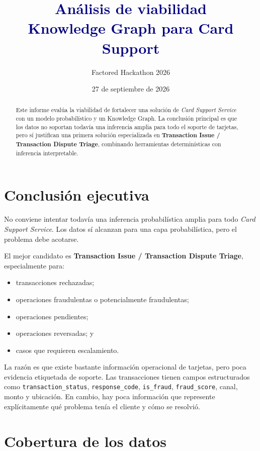 \documentclass[11pt,a4paper]{article}
\title{\textcolor{navy}{Análisis de viabilidad\\[2pt] Knowledge Graph para Card Support}}
\author{Factored Hackathon 2026}
\date{27 de septiembre de 2026}
\begin{document}
\maketitle

\begin{abstract}
Este informe evalúa la viabilidad de fortalecer una solución de \emph{Card Support Service} con un modelo probabilístico y un Knowledge Graph. La conclusión principal es que los datos no soportan todavía una inferencia amplia para todo el soporte de tarjetas, pero sí justifican una primera solución especializada en \textbf{Transaction Issue / Transaction Dispute Triage}, combinando herramientas determinísticas con inferencia interpretable.
\end{abstract}

\section{Conclusión ejecutiva}

No conviene intentar todavía una inferencia probabilística amplia para todo \emph{Card Support Service}. Los datos sí alcanzan para una capa probabilística, pero el problema debe acotarse.

El mejor candidato es \textbf{Transaction Issue / Transaction Dispute Triage}, especialmente para:

\begin{itemize}
  \item transacciones rechazadas;
  \item operaciones fraudulentas o potencialmente fraudulentas;
  \item operaciones pendientes;
  \item operaciones reversadas; y
  \item casos que requieren escalamiento.
\end{itemize}

La razón es que existe bastante información operacional de tarjetas, pero poca evidencia etiquetada de soporte. Las transacciones tienen campos estructurados como \texttt{transaction\_status}, \texttt{response\_code}, \texttt{is\_fraud}, \texttt{fraud\_score}, canal, monto y ubicación. En cambio, hay poca información que represente explícitamente qué problema tenía el cliente y cómo se resolvió.

\section{Cobertura de los datos}
\end{document}

